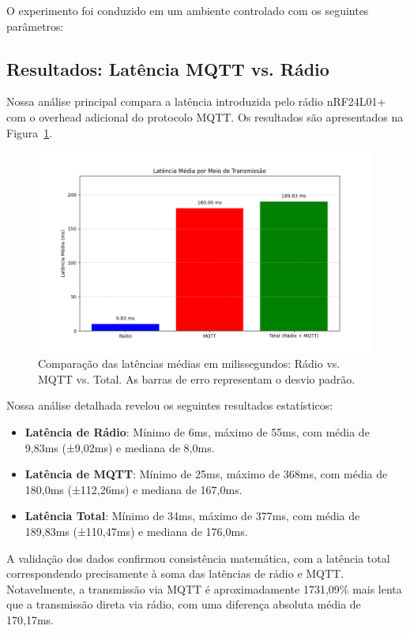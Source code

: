 \documentclass[hidelinks]{sbrt}
\begin{document}
O experimento foi conduzido em um ambiente controlado com os seguintes parâmetros:


\subsection{Resultados: Latência MQTT vs. Rádio}

Nossa análise principal compara a latência introduzida pelo rádio nRF24L01+ com o overhead adicional do protocolo MQTT. Os resultados são apresentados na Figura~\ref{fig:mqtt_vs_radio}.

\begin{figure}[h!]
    \centering
    \includegraphics[width=0.8\linewidth]{comparacao_latencias_barras.png}
    \caption{Comparação das latências médias em milissegundos: Rádio vs. MQTT vs. Total. As barras de erro representam o desvio padrão.}
    \label{fig:mqtt_vs_radio}
\end{figure}

Nossa análise detalhada revelou os seguintes resultados estatísticos:

\begin{itemize}
    \item \textbf{Latência de Rádio}: Mínimo de 6ms, máximo de 55ms, com média de 9,83ms (±9,02ms) e mediana de 8,0ms.
    
    \item \textbf{Latência de MQTT}: Mínimo de 25ms, máximo de 368ms, com média de 180,0ms (±112,26ms) e mediana de 167,0ms.
    
    \item \textbf{Latência Total}: Mínimo de 34ms, máximo de 377ms, com média de 189,83ms (±110,47ms) e mediana de 176,0ms.
\end{itemize}

A validação dos dados confirmou consistência matemática, com a latência total correspondendo precisamente à soma das latências de rádio e MQTT. Notavelmente, a transmissão via MQTT é aproximadamente 1731,09\% mais lenta que a transmissão direta via rádio, com uma diferença absoluta média de 170,17ms.
\end{document}
